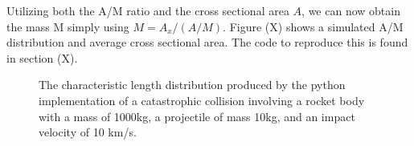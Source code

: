 \documentclass[a4paper, 12pt]{article}
\begin{document}
Utilizing both the A/M ratio and the cross sectional area $A$, we can now obtain the mass M simply using
$M = A_x / (A/M)$.
Figure (X)  shows a simulated A/M distribution and average cross sectional area. The code to reproduce this is found in section (X).
\begin{figure}[H]
	\begin{adjustbox}{max width=1.5\linewidth,center}
		\centering     %
	\end{adjustbox}
	\caption{The characteristic length distribution produced by the python implementation of a catastrophic collision involving a rocket body with a mass of 1000kg, a projectile of mass 10kg, and an impact velocity of 10 km/s. }
\end{figure}
\end{document}
